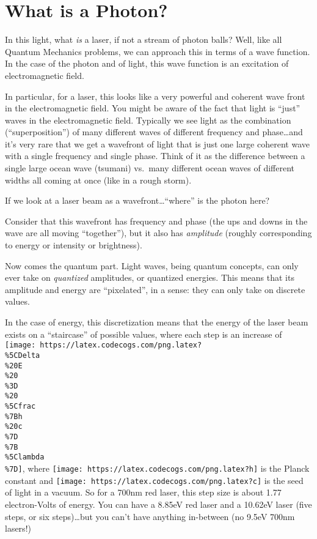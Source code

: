 \documentclass[]{article}
\begin{document}
\hypertarget{what-is-a-photon}{%
\section{What is a Photon?}\label{what-is-a-photon}}

In this light, what \emph{is} a laser, if not a stream of photon balls? Well,
like all Quantum Mechanics problems, we can approach this in terms of a wave
function. In the case of the photon and of light, this wave function is an
excitation of electromagnetic field.

In particular, for a laser, this looks like a very powerful and coherent wave
front in the electromagnetic field. You might be aware of the fact that light is
``just'' waves in the electromagnetic field. Typically we see light as the
combination (``superposition'') of many different waves of different frequency
and phase\ldots and it's very rare that we get a wavefront of light that is just
one large coherent wave with a single frequency and single phase. Think of it as
the difference between a single large ocean wave (tsumani) vs.~many different
ocean waves of different widths all coming at once (like in a rough storm).

If we look at a laser beam as a wavefront\ldots{}``where'' is the photon here?

Consider that this wavefront has frequency and phase (the ups and downs in the
wave are all moving ``together''), but it also has \emph{amplitude} (roughly
corresponding to energy or intensity or brightness).

Now comes the quantum part. Light waves, being quantum concepts, can only ever
take on \emph{quantized} amplitudes, or quantized energies. This means that its
amplitude and energy are ``pixelated'', in a sense: they can only take on
discrete values.

In the case of energy, this discretization means that the energy of the laser
beam exists on a ``staircase'' of possible values, where each step is an
increase of
\texttt{[image: https://latex.codecogs.com/png.latex?\\\%5CDelta\\\%20E\\\%20\\\%3D\\\%20\\\%5Cfrac\\\%7Bh\\\%20c\\\%7D\\\%7B\\\%5Clambda\\\%7D]},
where \texttt{[image: https://latex.codecogs.com/png.latex?h]} is the Planck
constant and \texttt{[image: https://latex.codecogs.com/png.latex?c]} is the
seed of light in a vacuum. So for a 700nm red laser, this step size is about
1.77 electron-Volts of energy. You can have a 8.85eV red laser and a 10.62eV
laser (five steps, or six steps)\ldots but you can't have anything in-between
(no 9.5eV 700nm lasers!)
\end{document}
